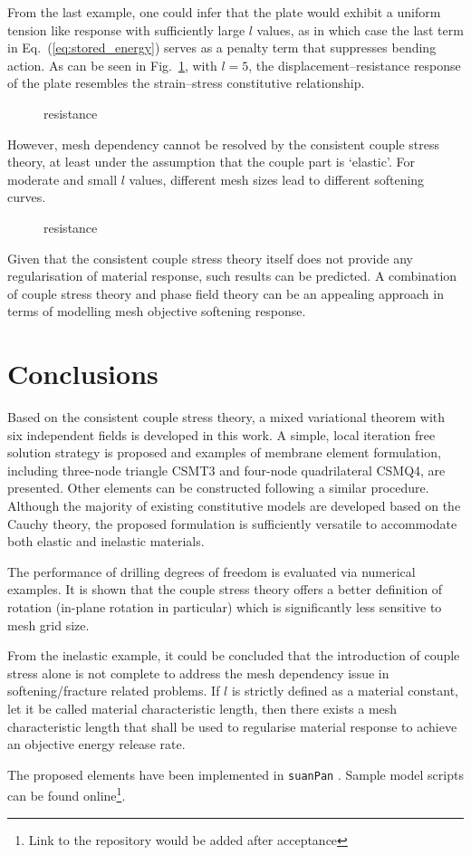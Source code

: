 \documentclass[3p,sort&compress,11pt,fleqn]{elsarticle}
\newcommand*{\figref}[1]{Fig.~\ref{#1}}
\newcommand*{\eqsref}[1]{Eq.~(\ref{#1})}
\begin{document}
From the last example, one could infer that the plate would exhibit a uniform tension like response with sufficiently large $l$ values, as in which case the last term in \eqsref{eq:stored_energy} serves as a penalty term that suppresses bending action. As can be seen in \figref{fig:plate_resistance_large_l}, with $l=\num{5}$, the displacement--resistance response of the plate resembles the strain--stress constitutive relationship.
\begin{figure}[ht]
\centering\footnotesize
\caption{resistance}\label{fig:plate_resistance_large_l}
\end{figure}

However, mesh dependency cannot be resolved by the consistent couple stress theory, at least under the assumption that the couple part is `elastic'. For moderate and small $l$ values, different mesh sizes lead to different softening curves.
\begin{figure}[ht]
\centering\footnotesize
\caption{resistance}\label{fig:plate_resistance_small_l}
\end{figure}
Given that the consistent couple stress theory itself does not provide any regularisation of material response, such results can be predicted. A combination of couple stress theory and phase field theory \citep{Bourdin2008} can be an appealing approach in terms of modelling mesh objective softening response.
\section{Conclusions}
Based on the consistent couple stress theory, a mixed variational theorem with six independent fields is developed in this work. A simple, local iteration free solution strategy is proposed and examples of membrane element formulation, including three-node triangle CSMT3 and four-node quadrilateral CSMQ4, are presented. Other elements can be constructed following a similar procedure. Although the majority of existing constitutive models are developed based on the Cauchy theory, the proposed formulation is sufficiently versatile to accommodate both elastic and inelastic materials.

The performance of drilling degrees of freedom is evaluated via numerical examples. It is shown that the couple stress theory offers a better definition of rotation (in-plane rotation in particular) which is significantly less sensitive to mesh grid size.

From the inelastic example, it could be concluded that the introduction of couple stress alone is not complete to address the mesh dependency issue in softening/fracture related problems. If $l$ is strictly defined as a material constant, let it be called material characteristic length, then there exists a mesh characteristic length that shall be used to regularise material response to achieve an objective energy release rate.

The proposed elements have been implemented in \texttt{suanPan} \citep{Chang2021}. Sample model scripts can be found online\footnote{Link to the repository would be added after acceptance}.

\end{document}
